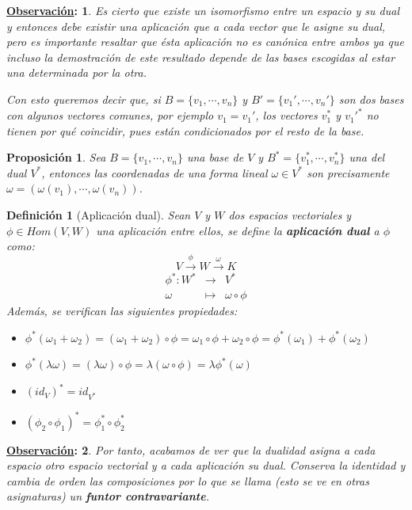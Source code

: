 \documentclass[10pt,a4paper,openright]{book}
\theoremstyle{break}
\newtheorem*{defi}{Definición}
\newtheorem*{prop}{Proposición}
\newtheorem*{obs}{\underline{Observación}:}
\begin{document}
\begin{obs}
Es cierto que existe un isomorfismo entre un espacio y su dual y entonces debe existir una aplicación que a cada vector que le asigne su dual, pero es importante resaltar que ésta aplicación no es canónica entre ambos ya que incluso la demostración de este resultado depende de las bases escogidas al estar una determinada por la otra.

Con esto queremos decir que, si $B=\{v_1,\cdots, v_n\}$ y $B'=\{v_1',\cdots, v_n'\}$ son dos bases con algunos vectores comunes, por ejemplo $v_1 = v_1'$, los vectores $v_1^*$ y $v_1'^*$ no tienen por qué coincidir, pues están condicionados por el resto de la base.
\end{obs}

\begin{prop}
Sea $B=\{v_1,\cdots, v_n\}$ una base de $V$ y $B^* = \{v_1^*,\cdots, v_n^*\}$ una del dual $V^*$, entonces las coordenadas de una forma lineal $\omega \in V^*$ son precisamente $\omega = (\omega(v_1), \cdots, \omega(v_n))$.
\end{prop}

\begin{defi}[Aplicación dual]
Sean $V$ y $W$ dos espacios vectoriales y $\phi \in Hom(V,W)$ una aplicación entre ellos, se define la \textbf{aplicación dual} a $\phi$ como:
$$V\xrightarrow{\phi} W\xrightarrow{\omega} K$$
\begin{eqnarray*}
\phi^*: W^* &\longrightarrow& V^* \\ \omega &\longmapsto& \omega\circ \phi 
\end{eqnarray*}
Además, se verifican las siguientes propiedades:
\begin{itemize}
\item $\phi^*(\omega_1+\omega_2)=(\omega_1+\omega_2)\circ \phi= \omega_1\circ \phi+\omega_2 \circ \phi= \phi^*(\omega_1)+\phi^*(\omega_2)$
\item $\phi^*(\lambda\omega)=(\lambda\omega)\circ \phi=\lambda(\omega\circ\phi)=\lambda \phi^*(\omega)$
\item $(id_V)^*=id_{V^*}$
\item $(\phi_2\circ\phi_1)^*=\phi_1^*\circ \phi_2^*$
\end{itemize}
\end{defi}

\begin{obs}
Por tanto, acabamos de ver que la dualidad asigna a cada espacio otro espacio vectorial y a cada aplicación su dual. Conserva la identidad y cambia de orden las composiciones por lo que se llama (esto se ve en otras asignaturas) un \textbf{funtor contravariante}.
\end{obs}
\end{document}
